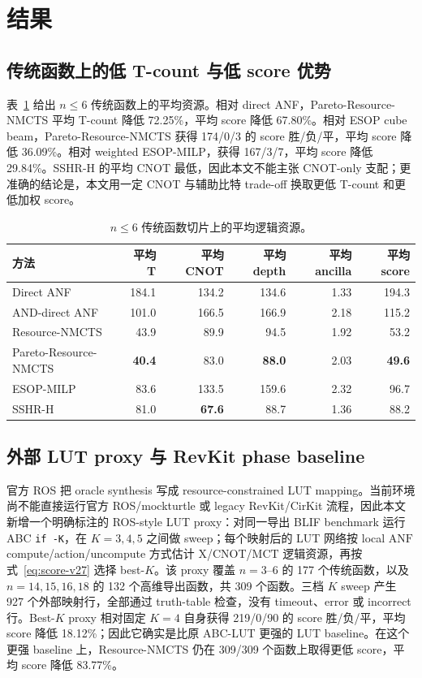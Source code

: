 \documentclass[UTF8,fontset=macnew,11pt]{ctexart}
\newcommand{\method}{Resource-NMCTS}
\newcommand{\anf}{\ensuremath{\mathrm{ANF}}}
\newcommand{\mct}{\ensuremath{\mathrm{MCT}}}
\begin{document}
\section{结果}

\subsection{传统函数上的低 T-count 与低 score 优势}

表~\ref{tab:traditional-v27} 给出 $n\leq6$ 传统函数上的平均资源。相对 direct ANF，Pareto-\method{} 平均 T-count 降低 72.25\%，平均 score 降低 67.80\%。相对 ESOP cube beam，Pareto-\method{} 获得 174/0/3 的 score 胜/负/平，平均 score 降低 36.09\%。相对 weighted ESOP-MILP，获得 167/3/7，平均 score 降低 29.84\%。SSHR-H 的平均 CNOT 最低，因此本文不能主张 CNOT-only 支配；更准确的结论是，本文用一定 CNOT 与辅助比特 trade-off 换取更低 T-count 和更低加权 score。

\begin{table}[H]
\centering
\small
\caption{$n\leq6$ 传统函数切片上的平均逻辑资源。}
\label{tab:traditional-v27}
\begin{tabular}{lrrrrr}
\toprule
方法 & 平均 T & 平均 CNOT & 平均 depth & 平均 ancilla & 平均 score \\
\midrule
Direct ANF & 184.1 & 134.2 & 134.6 & 1.33 & 194.3 \\
AND-direct ANF & 101.0 & 166.5 & 166.9 & 2.18 & 115.2 \\
\method{} & 43.9 & 89.9 & 94.5 & 1.92 & 53.2 \\
Pareto-\method{} & \textbf{40.4} & 83.0 & \textbf{88.0} & 2.03 & \textbf{49.6} \\
ESOP-MILP & 83.6 & 133.5 & 159.6 & 2.32 & 96.7 \\
SSHR-H & 81.0 & \textbf{67.6} & 88.7 & 1.36 & 88.2 \\
\bottomrule
\end{tabular}
\end{table}

\subsection{外部 LUT proxy 与 RevKit phase baseline}

官方 ROS 把 oracle synthesis 写成 resource-constrained LUT mapping。当前环境尚不能直接运行官方 ROS/mockturtle 或 legacy RevKit/CirKit 流程，因此本文新增一个明确标注的 ROS-style LUT proxy：对同一导出 BLIF benchmark 运行 ABC \texttt{if -K}，在 $K=3,4,5$ 之间做 sweep；每个映射后的 LUT 网络按 local \anf{} compute/action/uncompute 方式估计 X/CNOT/\mct{} 逻辑资源，再按式~\eqref{eq:score-v27} 选择 best-$K$。该 proxy 覆盖 $n=3$--$6$ 的 177 个传统函数，以及 $n=14,15,16,18$ 的 132 个高维导出函数，共 309 个函数。三档 $K$ sweep 产生 927 个外部映射行，全部通过 truth-table 检查，没有 timeout、error 或 incorrect 行。Best-$K$ proxy 相对固定 $K=4$ 自身获得 219/0/90 的 score 胜/负/平，平均 score 降低 18.12\%；因此它确实是比原 ABC-LUT 更强的 LUT baseline。在这个更强 baseline 上，\method{} 仍在 309/309 个函数上取得更低 score，平均 score 降低 83.77\%。
\end{document}
